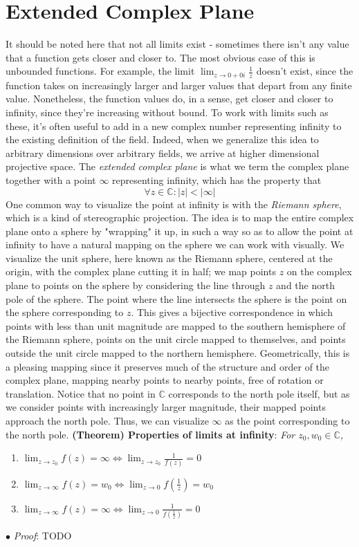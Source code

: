 \documentclass{article}
\newcommand*{\tb}{\textbf}
\newcommand*{\ti}{\textit}
\newcommand*{\nn}{\newline \newline}
\newcommand*{\Pf}{\indent \ensuremath{\bullet} \textit{Proof}: }
\newcommand*{\C}{\mathbb{C}}
\begin{document}
\section{Extended Complex Plane}
It should be noted here that not all limits exist - sometimes there isn't any value that a function gets closer and closer to. The most obvious case of this is unbounded functions. For example, the limit $ \lim_{z \to 0 + 0 i} \frac{1}{z} $ doesn't exist, since the function takes on increasingly larger and larger values that depart from any finite value. Nonetheless, the function values do, in a sense, get closer and closer to infinity, since they're increasing without bound. To work with limits such as these, it's often useful to add in a new complex number representing infinity to the existing definition of the field. Indeed, when we generalize this idea to arbitrary dimensions over arbitrary fields, we arrive at higher dimensional projective space.
\nn
The \ti{extended complex plane} is what we term the complex plane together with a point $ \infty $ representing infinity, which has the property that
$$ \forall z \in \C: | z | < | \infty | $$
One common way to visualize the point at infinity is with the \ti{Riemann sphere}, which is a kind of stereographic projection. The idea is to map the entire complex plane onto a sphere by "wrapping" it up, in such a way so as to allow the point at infinity to have a natural mapping on the sphere we can work with visually. We visualize the unit sphere, here known as the Riemann sphere, centered at the origin, with the complex plane cutting it in half; we map points $ z $ on the complex plane to points on the sphere by considering the line through $ z $ and the north pole of the sphere. The point where the line intersects the sphere is the point on the sphere corresponding to $ z $. This gives a bijective correspondence in which points with less than unit magnitude are mapped to the southern hemisphere of the Riemann sphere, points on the unit circle mapped to themselves, and points outside the unit circle mapped to the northern hemisphere. Geometrically, this is a pleasing mapping since it preserves much of the structure and order of the complex plane, mapping nearby points to nearby points, free of rotation or translation. Notice that no point in $ \C $ corresponds to the north pole itself, but as we consider points with increasingly larger magnitude, their mapped points approach the north pole. Thus, we can visualize $ \infty $ as the point corresponding to the north pole.
\nn
\tb{(Theorem) Properties of limits at infinity}: \ti{For $ z_0, w_0 \in \C $,}
\begin{enumerate}
    \item $ \lim_{z \to z_0} f(z) = \infty \iff \lim_{z \to z_0} \frac{1}{f(z)} = 0 $
    \item $ \lim_{z \to \infty} f(z) = w_0 \iff \lim_{z \to 0} f(\frac{1}{z}) = w_0 $
    \item $ \lim_{z \to \infty} f(z) = \infty \iff \lim_{z \to 0} \frac{1}{f(\frac{1}{z})} = 0 $
\end{enumerate}
\Pf TODO
\end{document}
